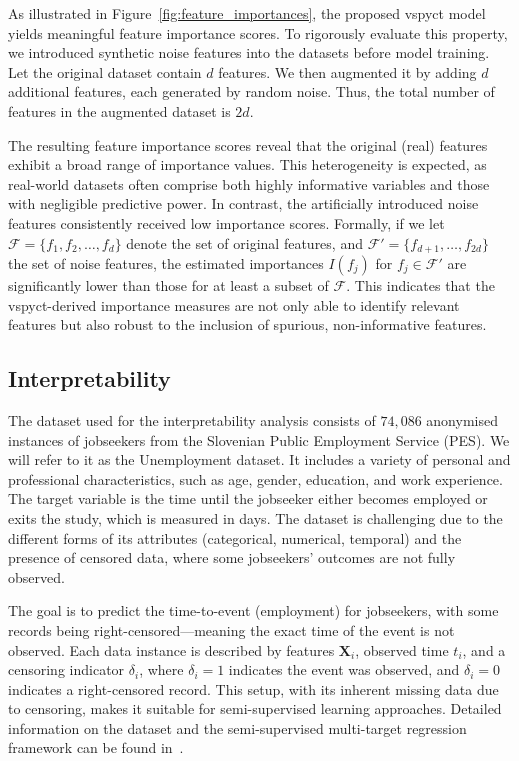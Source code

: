 \documentclass[3p,review,authoryear]{elsarticle}
\begin{document}
As illustrated in Figure~\ref{fig:feature_importances}, the proposed \gls{vspyct} model yields meaningful feature importance scores.
To rigorously evaluate this property, we introduced synthetic noise features into the datasets before model training.
Let the original dataset contain \(d\) features.
We then augmented it by adding \(d\) additional features, each generated by random noise.
Thus, the total number of features in the augmented dataset is \(2d\).

The resulting feature importance scores reveal that the original (real) features exhibit a broad range of importance values.
This heterogeneity is expected, as real-world datasets often comprise both highly informative variables and those with negligible predictive power.
In contrast, the artificially introduced noise features consistently received low importance scores.
Formally, if we let \(\mathcal{F} = \{f_1, f_2, \ldots, f_d\}\) denote the set of original features, and \(\mathcal{F}' = \{f_{d+1}, \ldots, f_{2d}\}\) the set of noise features, the estimated importances \(I(f_j)\) for \(f_j \in \mathcal{F}'\) are significantly lower than those for at least a subset of \(\mathcal{F}\).
This indicates that the \gls{vspyct}-derived importance measures are not only able to identify relevant features but also robust to the inclusion of spurious, non-informative features.


\subsection{Interpretability}

The dataset used for the interpretability analysis consists of $74,086$ anonymised instances of jobseekers from the Slovenian Public Employment Service (PES).
We will refer to it as the Unemployment dataset.
It includes a variety of personal and professional characteristics, such as age, gender, education, and work experience.
The target variable is the time until the jobseeker either becomes employed or exits the study, which is measured in days.
The dataset is challenging due to the different forms of its attributes (categorical, numerical, temporal) and the presence of censored data, where some jobseekers’ outcomes are not fully observed.

The goal is to predict the time-to-event (employment) for jobseekers, with some records being right-censored—meaning the exact time of the event is not observed.
Each data instance is described by features \(\mathbf{X}_i\), observed time \(t_i\), and a censoring indicator \(\delta_i\), where \(\delta_i = 1\) indicates the event was observed, and \(\delta_i = 0\) indicates a right-censored record.
This setup, with its inherent missing data due to censoring, makes it suitable for semi-supervised learning approaches.
Detailed information on the dataset and the semi-supervised multi-target regression framework can be found in~\cite{Andonovikj_2024}.
\end{document}
